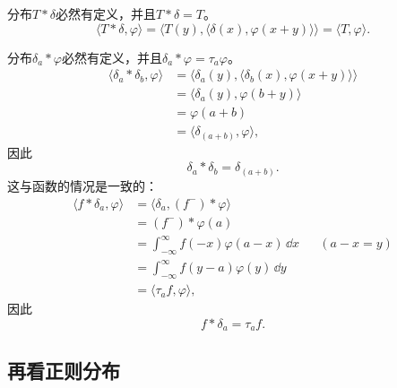 \begin{example}[与$\delta$卷积]
    分布$T*\delta$必然有定义，并且$T*\delta=T$。
    \begin{equation}
        \langle T*\delta,\varphi\rangle =\langle T(y),\langle \delta(x),\varphi(x+y)\rangle\rangle=\langle T,\varphi\rangle.
    \end{equation}
\end{example}

\begin{example}
    分布$\delta_a*\varphi$必然有定义，并且$\delta_a*\varphi=\tau_a \varphi$。
    \begin{align}
        \langle \delta_a*\delta_b,\varphi\rangle & =\langle \delta_a(y),\langle\delta_b(x),\varphi(x+y)\rangle\rangle\nonumber \\
                                                 & =\langle \delta_a(y),\varphi(b+y)\rangle\nonumber                    \\
                                                 & =\varphi(a+b)\nonumber                                               \\
                                                 & =\langle\delta_{(a+b)},\varphi\rangle,
    \end{align}
    因此
    \begin{equation}
        \delta_a*\delta_b=\delta_{(a+b)}.
    \end{equation}
    这与函数的情况是一致的：
    \begin{align}
        \langle f*\delta_a,\varphi\rangle & =\langle \delta_a,(f^-)*\varphi\rangle\nonumber                  \\
                                          & =(f^-)*\varphi(a)\nonumber                                       \\
                                          & =\int_{-\infty}^{\infty}f(-x)\varphi(a-x)\,\dd x && (a-x=y)\nonumber \\
                                          & =\int_{-\infty}^{\infty}f(y-a)\varphi(y)\,\dd y\nonumber\\
                                          & =\langle \tau_a f,\varphi\rangle,
    \end{align}
    因此
    \begin{equation}
        f*\delta_a=\tau_a f.
    \end{equation}
\end{example}

\subsection{再看正则分布}\label{sub:normal_distribution}

